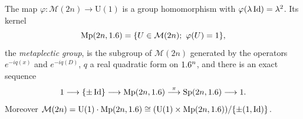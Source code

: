 \begin{theorem}\label{isotropic:thm:metaplectic}
The map $\varphi:\mathcal M(2n)\to\mathrm U(1)$ is a group homomorphism with
$\varphi(\lambda\operatorname{Id})=\lambda^2$. Its kernel
\begin{equation*}
  \mathrm{Mp}(2n,\R)=\{U\in\mathcal M(2n);\ \varphi(U)=1\},
\end{equation*}
the \emph{metaplectic group}, is the subgroup of $\mathcal M(2n)$ generated by
the operators $e^{-iq(x)}$ and $e^{-iq(D)}$, $q$ a real quadratic form on
$1.6^n$, and there is an exact sequence
\begin{equation}\label{isotropic:eq:double-cover}
  1\longrightarrow\{\pm\operatorname{Id}\}\longrightarrow\mathrm{Mp}(2n,1.6)\overset{\pi}{\longrightarrow}\mathrm{Sp}(2n,1.6)\longrightarrow1 .
\end{equation}
Moreover $\mathcal M(2n)=\mathrm U(1)\cdot\mathrm{Mp}(2n,1.6)\cong(\mathrm U(1)\times\mathrm{Mp}(2n,1.6))/\{\pm(1,\operatorname{Id})\}$.
\end{theorem}
